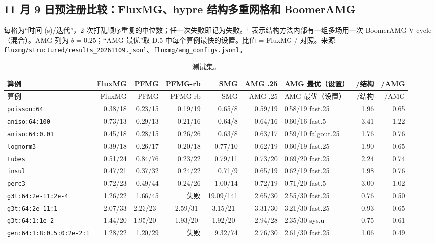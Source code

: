 \subsection{11 月 9 日预注册比较：FluxMG、hypre 结构多重网格和 BoomerAMG}
每格为“时间 (s)/迭代”，2 次打乱顺序重复的中位数；任一次失败即记为失败。$^\dagger$ 表示结构方法内部有一组多场用一次 BoomerAMG V-cycle（混合）。AMG 列为 $\theta=0.25$；“AMG 最优”取 D.5 中每个算例最快的设置。比值 = FluxMG / 对照。来源 \texttt{fluxmg/structured/results\_20261109.jsonl}、\texttt{fluxmg/amg\_configs.jsonl}。
{\scriptsize\setlength{\tabcolsep}{3pt}
\begin{longtable}{lrrrrrlrr}
\caption{测试集。}\\
\toprule
算例 & FluxMG & PFMG & PFMG-rb & SMG & AMG .25 & AMG 最优（设置） & /结构 & /AMG \\
\midrule
\endfirsthead
\toprule
算例 & FluxMG & PFMG & PFMG-rb & SMG & AMG .25 & AMG 最优（设置） & /结构 & /AMG \\
\midrule
\endhead
\bottomrule
\endlastfoot
\texttt{poisson:64} & 0.38/18 & 0.23/15 & 0.19/19 & 0.65/8 & 0.59/19 & 0.58/19 fast.25 & 1.96 & 0.65 \\
\texttt{aniso:64:100} & 0.73/13 & 0.29/13 & 0.21/16 & 0.64/8 & 0.64/16 & 0.60/16 fast.5 & 3.41 & 1.22 \\
\texttt{aniso:64:0.01} & 0.45/18 & 0.28/15 & 0.26/26 & 0.63/8 & 0.63/17 & 0.59/10 falgout.25 & 1.76 & 0.76 \\
\texttt{lognorm3} & 0.39/18 & 0.26/17 & 0.20/18 & 0.77/10 & 0.62/19 & 0.60/19 fast.25 & 1.90 & 0.65 \\
\texttt{tubes} & 0.51/24 & 0.84/76 & 0.23/22 & 0.79/11 & 0.73/20 & 0.69/20 fast.25 & 2.24 & 0.74 \\
\texttt{insul} & 0.47/21 & 0.37/32 & 0.24/22 & 0.71/9 & 0.65/19 & 0.62/19 fast.25 & 1.98 & 0.76 \\
\texttt{perc3} & 0.72/23 & 0.49/44 & 0.24/26 & 1.00/14 & 0.72/19 & 0.71/20 fast.5 & 3.00 & 1.02 \\
\texttt{g3t:64:2e-11:2e-4} & 1.26/22 & 1.66/45 & 失败 & 19.09/141 & 2.65/30 & 2.55/30 fast.25 & 0.76 & 0.50 \\
\texttt{g3t:64:2e-11:1} & 2.07/33 & 2.23/23$^\dagger$ & 2.59/31$^\dagger$ & 3.15/21$^\dagger$ & 3.31/30 & 3.21/30 fast.25 & 0.93 & 0.65 \\
\texttt{g3t:64:1:1e-2} & 1.44/20 & 1.95/20$^\dagger$ & 1.93/20$^\dagger$ & 1.92/20$^\dagger$ & 2.94/28 & 2.35/30 sys.u & 0.75 & 0.61 \\
\texttt{gen:64:1:8:0.5:0:2e-2:1} & 1.28/22 & 1.20/29 & 失败 & 9.32/74 & 2.76/30 & 2.61/30 fast.25 & 1.06 & 0.49 \\

\end{longtable}}
